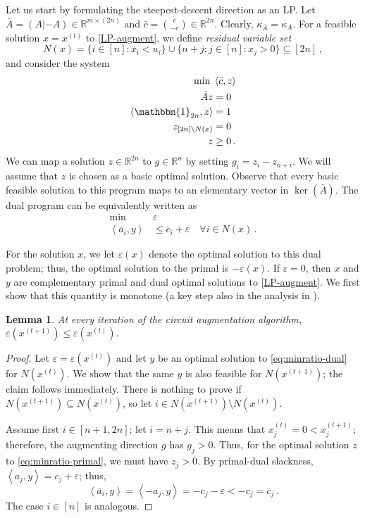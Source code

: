 \documentclass[11pt, a4paper]{article}
\newcommand{\Le}{\kappa}
\newcommand{\pr}[2]{\left\langle #1, #2 \right\rangle}
\newcommand{\1}{\mathbbm{1}}
\newtheorem{lemma}[theorem]{Lemma}
\theoremstyle{case}
\newcommand{\R}{\mathbb{R}}
\begin{document}
Let us start by formulating the steepest-descent direction as an LP. 
Let ${\bar A}=(A|-A)\in \R^{m\times (2n)}$ and $\bar c=\binom{c}{-c}\in \R^{2n}$. Clearly, $\Le_{\bar A}=\Le_A$.
For a feasible solution $x=x^{(t)}$ to \ref{LP-augment}, we define 
\emph{residual variable set} 
\[
N(x)=\{i\in [n]: x_i<u_i\}\cup \{n+j: j\in [n]: x_j>0\}\subseteq [2n]\, ,
\]
and consider  the system
\begin{equation}
\label{eq:minratio-primal}
\begin{aligned}
\min \; & \pr{\bar c}{z} \\ 
\bar A z&=0 \\
\pr{\1_{2n}}{z}&=1\\
z_{[2n] \setminus N(x)} &= 0\\
z&\ge 0\,.\\
\end{aligned}
\end{equation}
We can map a solution $z\in \R^{2n}$ to $g\in \R^n$ by setting $g_i=z_i-z_{n+i}$.
We will assume that $z$ is chosen as a basic optimal solution.
Observe that every basic feasible solution to this program maps to an elementary vector in $\ker(\bar A)$.
The dual program can be equivalently written as 
\begin{equation}
\label{eq:minratio-dual}
\begin{aligned}
\min \; & \varepsilon \\ 
\pr{\bar a_i}{y}&\le \bar c_i +\varepsilon \quad\forall i\in N(x)\,.
\end{aligned}
\end{equation}

For the solution $x$, we let $\varepsilon(x)$ denote the optimal solution to this dual problem; thus, the optimal solution to the primal is $-\varepsilon(x)$. 
If $\varepsilon=0$, then $x$ and $y$ are complementary primal and dual optimal solutions to \ref{LP-augment}. We first show that this quantity is monotone (a key step also in the analysis in \cite{DHL15}).

\begin{lemma}\label{lem:epsilon-mon} At every iteration of the circuit augmentation algorithm, $\varepsilon(x^{(t+1)})\le \varepsilon(x^{(t)})$.
\end{lemma}
\begin{proof}
Let $\varepsilon=\varepsilon(x^{(t)})$ and let $y$ be an optimal solution to \eqref{eq:minratio-dual} for $N(x^{(t)})$. We show that the same $y$ is also feasible for $N(x^{(t+1)})$; the claim follows immediately.  There is nothing to prove if $N(x^{(t+1)})\subseteq N(x^{(t)})$, so let $i\in N(x^{(t+1)})\setminus  N(x^{(t)})$.

Assume first $i\in [n+1,2n]$; let $i=n+j$. This means that $x^{(t)}_j=0<x_j^{(t+1)}$; therefore,  the augmenting direction $g$ has $g_{j}>0$. Thus, for the optimal solution $z$ to  \eqref{eq:minratio-primal}, we must have $z_j>0$. By primal-dual slackness, $\pr{a_j}{y}=c_j+\varepsilon$; thus, 
\[
\pr{\bar a_i}{y}=\pr{-a_j}{y}=-c_j-\varepsilon<-c_j=\bar c_j\, .
\]
The case $i\in [n]$ is analogous.
\end{proof}
\end{document}
